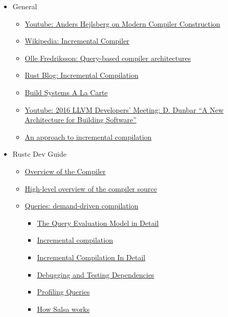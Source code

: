 \documentclass[12pt, a4paper]{report}
\begin{document}
\begin{itemize}[noitemsep]
	
\item General
	\begin{itemize}[noitemsep]
	\item \href{https://www.youtube.com/watch?v=wSdV1M7n4gQ}{\CheckedBox Youtube: Anders Hejlsberg on Modern Compiler Construction}
	\item \href{https://en.wikipedia.org/wiki/Incremental_compiler}{\CheckedBox Wikipedia: Incremental Compiler}
	\item \href{https://ollef.github.io/blog/posts/query-based-compilers.html}{\CheckedBox Olle Fredriksson: Query-based compiler architectures}
	\item \href{https://blog.rust-lang.org/2016/09/08/incremental.html}{\CheckedBox Rust Blog: Incremental Compilation}
	\item \href{https://www.microsoft.com/en-us/research/publication/build-systems-la-carte/}{\Square Build Systems A La Carte}
	\item \href{https://www.youtube.com/watch?v=b_T-eCToX1I}{\Square Youtube: 2016 LLVM Developers’ Meeting: D. Dunbar “A New Architecture for Building Software”}
	\item \href{https://dl.acm.org/doi/10.1145/502949.502889}{\Square An approach to incremental compilation}
	\end{itemize}

\item Rustc Dev Guide
	\begin{itemize}[noitemsep]
	\item \href{https://rustc-dev-guide.rust-lang.org/overview.html}{\Square Overview of the Compiler}
	\item \href{https://rustc-dev-guide.rust-lang.org/compiler-src.html}{\Square High-level overview of the compiler source}
	\item \href{https://rustc-dev-guide.rust-lang.org/query.html}{\Square Queries: demand-driven compilation}
		\begin{itemize}[noitemsep]
		\item \href{https://rustc-dev-guide.rust-lang.org/queries/query-evaluation-model-in-detail.html}{\Square The Query Evaluation Model in Detail}
		\item \href{https://rustc-dev-guide.rust-lang.org/queries/incremental-compilation.html}{\Square Incremental compilation}
		\item \href{https://rustc-dev-guide.rust-lang.org/queries/incremental-compilation-in-detail.html}{\Square Incremental Compilation In Detail}
		\item \href{https://rustc-dev-guide.rust-lang.org/incrcomp-debugging.html}{\Square Debugging and Testing Dependencies}
		\item \href{https://rustc-dev-guide.rust-lang.org/queries/profiling.html}{\Square Profiling Queries}
		\item \href{https://rustc-dev-guide.rust-lang.org/salsa.html}{\Square How Salsa works}
		\end{itemize}
	\end{itemize}


\end{itemize}
\end{document}
